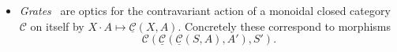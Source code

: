 \documentclass[11pt,letterpaper]{article}
\theoremstyle{plain}
\theoremstyle{definition}
\newtheorem{remark}[theorem]{Remark}
\newcommand{\C}{\mathscr{C}}
\newcommand{\homC}{\underline{\C}}
\newcommand{\D}{\mathscr{D}}
\newcommand{\Optic}{\mathbf{Optic}}
\newcommand{\act}{\cdot}
\newcommand{\hto}{\ensuremath{\,\mathaccent\shortmid\rightarrow\,}}
\newcommand{\todo}[1]{\textcolor{red}{\small #1}}
\begin{document}
\begin{itemize}

\item \emph{Grates}~\cite{GratesPost} are optics for the contravariant action of a monoidal closed category $\C$ on itself by $X \cdot A \mapsto \homC(X, A)$. Concretely these correspond to morphisms \[ \C(\homC(\homC(S, A), A'), S'). \]

\end{itemize}
\end{document}

